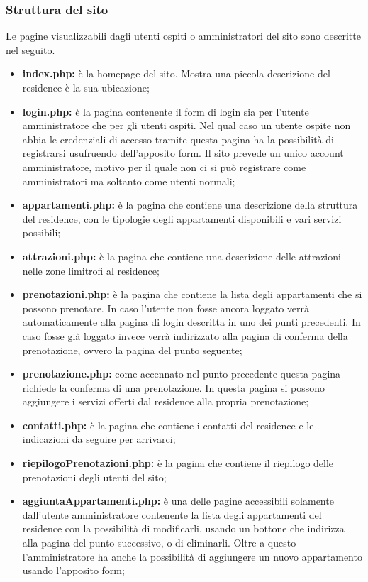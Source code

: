 \documentclass[12pt]{article}
\begin{document}
\subsubsection{Struttura del sito}
Le pagine visualizzabili dagli utenti ospiti o amministratori del sito sono descritte nel seguito.
\begin{itemize}
\item \textbf{index.php:} è la homepage del sito. Mostra una piccola descrizione del residence è la sua ubicazione; 
\item \textbf{login.php:} è la pagina contenente il form di login sia per l'utente amministratore che per gli utenti ospiti. Nel qual caso un utente ospite non abbia le credenziali di accesso tramite questa pagina ha la possibilità di registrarsi usufruendo dell'apposito form. Il sito prevede un unico account amministratore, motivo per il quale non ci si può registrare come amministratori ma soltanto come utenti normali;
\item \textbf{appartamenti.php:} è la pagina che contiene una descrizione della struttura del residence, con le tipologie degli appartamenti disponibili e vari servizi possibili;
\item \textbf{attrazioni.php:} è la pagina che contiene una descrizione delle attrazioni nelle zone limitrofi al residence;
\item \textbf{prenotazioni.php:} è la pagina che contiene la lista degli appartamenti che si possono prenotare. In caso l'utente non fosse ancora loggato verrà automaticamente alla pagina di login descritta in uno dei punti precedenti. In caso fosse già loggato invece verrà indirizzato alla pagina di conferma della prenotazione, ovvero la pagina del punto seguente;
\item \textbf{prenotazione.php:} come accennato nel punto precedente questa pagina richiede la conferma di una prenotazione. In questa pagina si possono aggiungere i servizi offerti dal residence alla propria prenotazione;
\item \textbf{contatti.php:} è la pagina che contiene i contatti del residence e le indicazioni da seguire per arrivarci;
\item \textbf{riepilogoPrenotazioni.php:} è la pagina che contiene il riepilogo delle prenotazioni degli utenti del sito;
\item \textbf{aggiuntaAppartamenti.php:} è una delle pagine accessibili solamente dall'utente amministratore contenente la lista degli appartamenti del residence con la possibilità di modificarli, usando un bottone che indirizza alla pagina del punto successivo, o di eliminarli. Oltre a questo l'amministratore ha anche la possibilità di aggiungere un nuovo appartamento usando l'apposito form;

\end{itemize}
\end{document}
